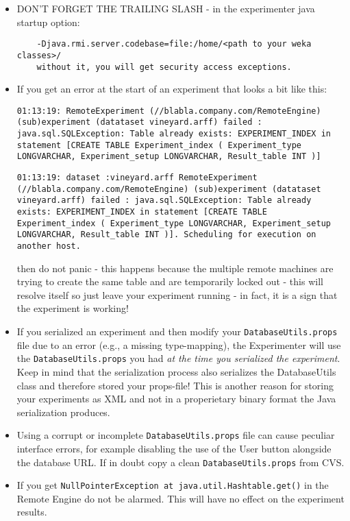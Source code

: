 \documentclass[a4paper]{article}
\begin{document}
\begin{itemize}
   \item DON'T FORGET THE TRAILING SLASH - in the experimenter java startup option: 
		\begin{verbatim}
    -Djava.rmi.server.codebase=file:/home/<path to your weka classes>/ 
    without it, you will get security access exceptions. 
    	\end{verbatim}

   \item If you get an error at the start of an experiment that looks a bit like this: 

    \texttt{01:13:19: RemoteExperiment (//blabla.company.com/RemoteEngine) (sub)experiment (datataset vineyard.arff) failed : java.sql.SQLException: Table already exists: EXPERIMENT\_INDEX in statement [CREATE TABLE Experiment\_index ( Experiment\_type LONGVARCHAR, Experiment\_setup LONGVARCHAR, Result\_table INT )]} 

    \texttt{01:13:19: dataset :vineyard.arff RemoteExperiment \\ (//blabla.company.com/RemoteEngine) (sub)experiment (datataset vineyard.arff) failed : java.sql.SQLException: Table already exists: EXPERIMENT\_INDEX in statement [CREATE TABLE Experiment\_index ( Experiment\_type LONGVARCHAR, Experiment\_setup LONGVARCHAR, Result\_table INT )]. Scheduling for execution on another host.} 

    then do not panic - this happens because the multiple remote machines are trying to create the same table and are temporarily locked out - this will resolve itself so just leave your experiment running - in fact, it is a sign that the experiment is working! 

   \item If you serialized an experiment and then modify your \texttt{DatabaseUtils.props} file due to an error (e.g., a missing type-mapping), the Experimenter will use the \texttt{DatabaseUtils.props} you had \textit{at the time you serialized the experiment}. Keep in mind that the serialization process also serializes the DatabaseUtils class and therefore stored your props-file! This is another reason for storing your experiments as XML and not in a properietary binary format the Java serialization produces. 

   \item Using a corrupt or incomplete \texttt{DatabaseUtils.props} file can cause peculiar interface errors, for example disabling the use of the User button alongside the database URL. If in doubt copy a clean \texttt{DatabaseUtils.props} from CVS. 

   \item If you get \texttt{NullPointerException at java.util.Hashtable.get()} in the Remote Engine do not be alarmed. This will have no effect on the experiment results. 
\end{itemize}
    
\end{document}
